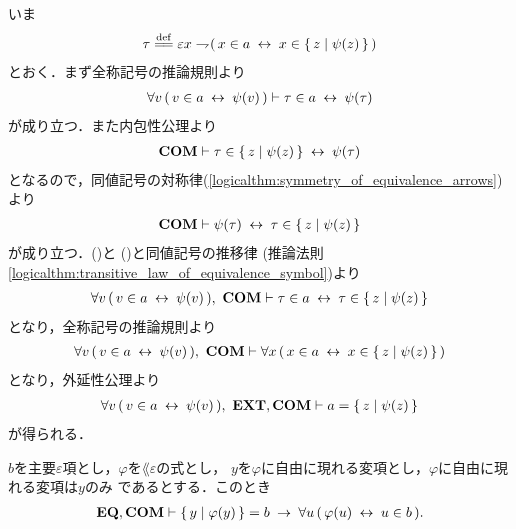 	\begin{sketch}
		いま
		\begin{align}
			\tau \defeq 
			\varepsilon x \negation (\, x \in a \lrarrow x \in \Set{z}{\psi(z)}\, )
		\end{align}
		とおく．まず全称記号の推論規則より
		\begin{align}
			\forall v\, (\, v \in a \hspace{0.25em}\leftrightarrow\hspace{0.25em} \psi(v)\, )
			\vdash \tau \in a \hspace{0.25em}\leftrightarrow\hspace{0.25em} \psi(\tau)
			\label{fom:equivalent_formula_rewriting_2_1}
		\end{align}
		が成り立つ．また内包性公理より
		\begin{align}
			\mbox{\bf COM} \vdash \tau \in \left\{\, z \mid \psi(z)\, \right\} \hspace{0.25em}\leftrightarrow\hspace{0.25em} \psi(\tau)
		\end{align}
		となるので，同値記号の対称律(\ref{logicalthm:symmetry_of_equivalence_arrows})より
		\begin{align}
			\mbox{\bf COM} \vdash \psi(\tau) \hspace{0.25em}\leftrightarrow\hspace{0.25em} \tau \in \left\{\, z \mid \psi(z)\, \right\}
			\label{fom:equivalent_formula_rewriting_2_2}
		\end{align}
		が成り立つ．()と
		()と同値記号の推移律
		(推論法則\ref{logicalthm:transitive_law_of_equivalence_symbol})より
		\begin{align}
			\forall v\, (\, v \in a \hspace{0.25em}\leftrightarrow\hspace{0.25em} \psi(v)\, ),\ \mbox{\bf COM} \vdash
			\tau \in a \hspace{0.25em}\leftrightarrow\hspace{0.25em} \tau \in \left\{\, z \mid \psi(z)\, \right\}
		\end{align}
		となり，全称記号の推論規則より
		\begin{align}
			\forall v\, (\, v \in a \hspace{0.25em}\leftrightarrow\hspace{0.25em} \psi(v)\, ),\ \mbox{\bf COM} \vdash
			\forall x\, (\, x \in a \hspace{0.25em}\leftrightarrow\hspace{0.25em} x \in \left\{\, z \mid \psi(z)\, \right\}\, )
		\end{align}
		となり，外延性公理より
		\begin{align}
			\forall v\, (\, v \in a \hspace{0.25em}\leftrightarrow\hspace{0.25em} \psi(v)\, ),\ \mbox{{\bf EXT}},\mbox{\bf COM} \vdash
			a = \left\{\, z \mid \psi(z)\, \right\}
		\end{align}
		が得られる．
		\QED
	\end{sketch}
	
	\begin{screen}
		\begin{thm}
		\label{thm:equivalent_formula_rewriting_3}
			$b$を主要$\varepsilon$項とし，$\varphi$を$\lang{\varepsilon}$の式とし，
			$y$を$\varphi$に自由に現れる変項とし，$\varphi$に自由に現れる変項は$y$のみ
			であるとする．このとき
			\begin{align}
				\mbox{{\bf EQ}},\mbox{\bf COM} \vdash \left\{\, y \mid \varphi(y)\, \right\} = b 
				\hspace{0.25em}\rightarrow\hspace{0.25em} \forall u\, (\, \varphi(u) \hspace{0.25em}\leftrightarrow\hspace{0.25em} u \in b\, ).
			\end{align}
		\end{thm}
	\end{screen}
	
